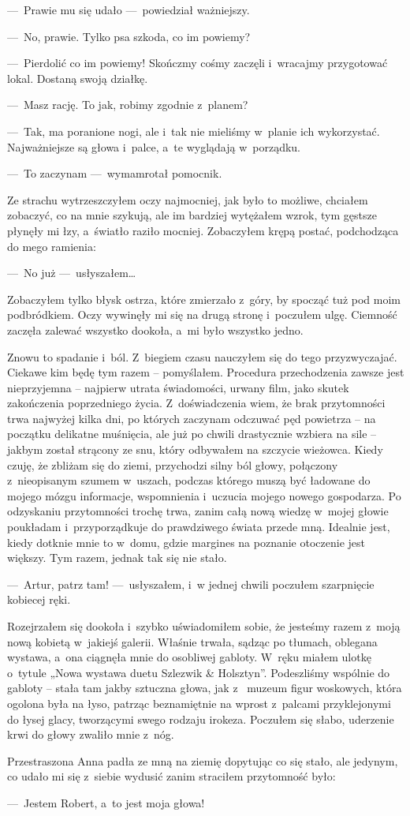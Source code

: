 ---~Prawie mu się udało ---~powiedział ważniejszy.

---~No, prawie. Tylko psa szkoda, co im powiemy?

---~Pierdolić co im powiemy! Skończmy cośmy zaczęli i~wracajmy przygotować lokal. Dostaną swoją działkę.

---~Masz rację. To jak, robimy zgodnie z~planem? 

---~Tak, ma poranione nogi, ale i~tak nie mieliśmy w~planie ich wykorzystać. Najważniejsze są głowa i~palce, a~te 
wyglądają w~porządku.

---~To zaczynam ---~wymamrotał pomocnik.

Ze strachu wytrzeszczyłem oczy najmocniej, jak było to możliwe, chciałem zobaczyć, co na mnie szykują, ale im 
bardziej wytężałem wzrok, tym gęstsze płynęły mi łzy, a~światło raziło mocniej. Zobaczyłem krępą postać, podchodząca 
do mego ramienia: 

---~No już ---~usłyszałem…

Zobaczyłem tylko błysk ostrza, które zmierzało z~góry, by spocząć tuż pod moim podbródkiem. Oczy wywinęły mi się na 
drugą stronę i~poczułem ulgę. Ciemność zaczęła zalewać wszystko dookoła, a~mi było wszystko jedno. 

\paraSep

Znowu to spadanie i~ból. Z~biegiem czasu nauczyłem się do tego przyzwyczajać. Ciekawe kim będę tym razem -- 
pomyślałem. Procedura przechodzenia zawsze jest nieprzyjemna -- najpierw utrata świadomości, urwany film, jako skutek 
zakończenia poprzedniego życia. Z~doświadczenia wiem, że brak przytomności trwa najwyżej kilka dni, po których 
zaczynam odczuwać pęd powietrza -- na początku delikatne muśnięcia, ale już po chwili drastycznie wzbiera na sile -- 
jakbym został strącony ze snu, który odbywałem na szczycie wieżowca. Kiedy czuję, że zbliżam się do ziemi, przychodzi 
silny ból głowy, połączony z~nieopisanym szumem w~uszach, podczas którego muszą być ładowane do mojego mózgu 
informacje, wspomnienia i~uczucia mojego nowego gospodarza. Po odzyskaniu przytomności trochę trwa, zanim całą nową 
wiedzę w~mojej głowie poukładam i~przyporządkuje do prawdziwego świata przede mną. Idealnie jest, kiedy dotknie mnie 
to w~domu, gdzie margines na poznanie otoczenie jest większy. Tym razem, jednak tak się nie stało. 

---~Artur, patrz tam! ---~usłyszałem, i~w jednej chwili poczułem szarpnięcie kobiecej ręki.
 
Rozejrzałem się dookoła i~szybko uświadomiłem sobie, że jesteśmy razem z~moją nową kobietą w~jakiejś galerii. Właśnie 
trwała, sądząc po tłumach, oblegana wystawa, a~ona ciągnęła mnie do osobliwej gabloty. W~ręku miałem ulotkę o~tytule 
„Nowa wystawa duetu Szlezwik \& Holsztyn”. Podeszliśmy wspólnie do gabloty -- stała tam jakby sztuczna głowa, jak z~
muzeum figur woskowych, która ogolona była na łyso, patrząc beznamiętnie na wprost z~palcami przyklejonymi do łysej 
glacy, tworzącymi swego rodzaju irokeza. Poczułem się słabo, uderzenie krwi do głowy zwaliło mnie z~nóg. 

Przestraszona Anna padła ze mną na ziemię dopytując co się stało, ale jedynym, co udało mi się z~siebie wydusić zanim 
straciłem przytomność było: 

---~Jestem Robert, a~to jest moja głowa!
